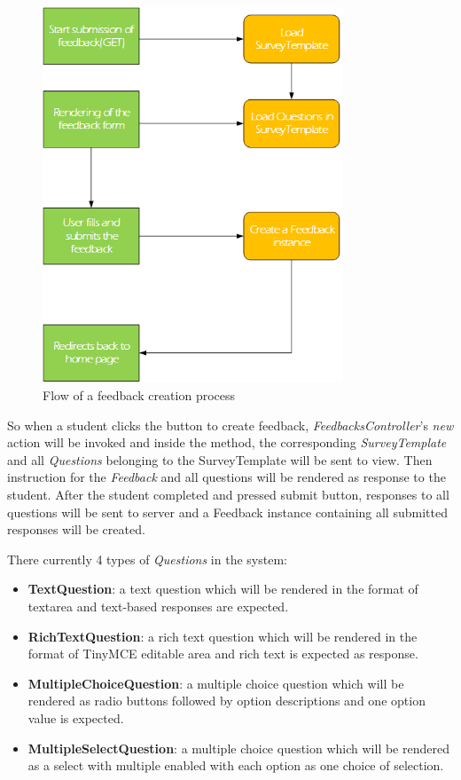 \begin{figure}[h]
  \centering
  \includegraphics[width=0.8\textwidth]{Images/Skylab_Feedback_Flow.png}
  \caption{Flow of a feedback creation process}
  \label{fig:FeedbackFlow}
\end{figure}

So when a student clicks the button to create feedback, \textit{FeedbacksController}'s \textit{new} action will be invoked and inside the method, the corresponding \textit{SurveyTemplate} and all \textit{Questions} belonging to the SurveyTemplate will be sent to view. Then instruction for the \textit{Feedback} and all questions will be rendered as response to the student. After the student completed and pressed submit button, responses to all questions will be sent to server and a Feedback instance containing all submitted responses will be created.

There currently 4 types of \textit{Questions} in the system:

\begin{itemize}
  \item \textbf{TextQuestion}: a text question which will be rendered in the format of textarea and text-based responses are expected. 
  \item \textbf{RichTextQuestion}: a rich text question which will be rendered in the format of TinyMCE editable area and rich text is expected as response.
  \item \textbf{MultipleChoiceQuestion}: a multiple choice question which will be rendered as radio buttons followed by option descriptions and one option value is expected.
  \item \textbf{MultipleSelectQuestion}: a multiple choice question which will be rendered as a select with multiple enabled with each option as one choice of selection.
\end{itemize}

